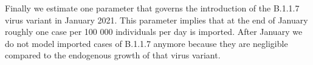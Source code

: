 Finally we estimate one parameter that governs the introduction of the B.1.1.7 virus
variant in January 2021. This parameter implies that at the end of January roughly one
case per 100 000 individuals per day is imported. After January we do not model imported
cases of B.1.1.7 anymore because they are negligible compared to the endogenous growth
of that virus variant.




